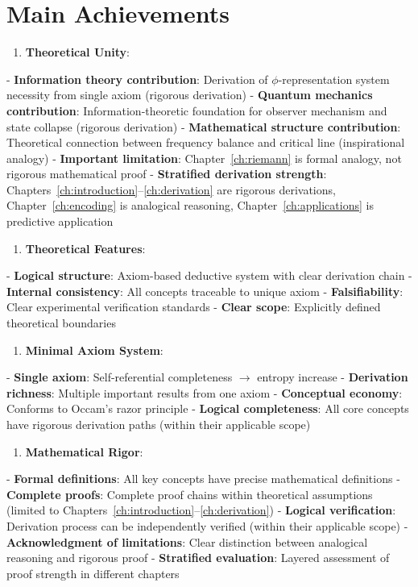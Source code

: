 \section{Main Achievements}
\label{sec:ch08_conclusion:main-achievements}

\begin{enumerate}
\item \textbf{Theoretical Unity}:
\end{enumerate}
   - \textbf{Information theory contribution}: Derivation of $\phi$-representation system necessity from single axiom (rigorous derivation)
   - \textbf{Quantum mechanics contribution}: Information-theoretic foundation for observer mechanism and state collapse (rigorous derivation)
   - \textbf{Mathematical structure contribution}: Theoretical connection between frequency balance and critical line (inspirational analogy)
   - \textbf{Important limitation}: Chapter~\ref{ch:riemann} is formal analogy, not rigorous mathematical proof
   - \textbf{Stratified derivation strength}: Chapters~\ref{ch:introduction}--\ref{ch:derivation} are rigorous derivations, Chapter~\ref{ch:encoding} is analogical reasoning, Chapter~\ref{ch:applications} is predictive application

\begin{enumerate}
\item \textbf{Theoretical Features}:
\end{enumerate}
   - \textbf{Logical structure}: Axiom-based deductive system with clear derivation chain
   - \textbf{Internal consistency}: All concepts traceable to unique axiom
   - \textbf{Falsifiability}: Clear experimental verification standards
   - \textbf{Clear scope}: Explicitly defined theoretical boundaries

\begin{enumerate}
\item \textbf{Minimal Axiom System}:
\end{enumerate}
   - \textbf{Single axiom}: Self-referential completeness $\rightarrow$ entropy increase
   - \textbf{Derivation richness}: Multiple important results from one axiom
   - \textbf{Conceptual economy}: Conforms to Occam's razor principle
   - \textbf{Logical completeness}: All core concepts have rigorous derivation paths (within their applicable scope)

\begin{enumerate}
\item \textbf{Mathematical Rigor}:
\end{enumerate}
   - \textbf{Formal definitions}: All key concepts have precise mathematical definitions
   - \textbf{Complete proofs}: Complete proof chains within theoretical assumptions (limited to Chapters~\ref{ch:introduction}--\ref{ch:derivation})
   - \textbf{Logical verification}: Derivation process can be independently verified (within their applicable scope)
   - \textbf{Acknowledgment of limitations}: Clear distinction between analogical reasoning and rigorous proof
   - \textbf{Stratified evaluation}: Layered assessment of proof strength in different chapters

